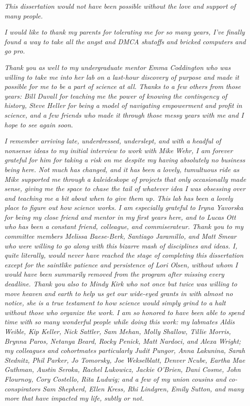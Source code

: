 \begin{acknowledgements}
\textit{This dissertation would not have been possible without the love and support of many people.}

\textit{I would like to thank my parents for tolerating me for so many years, I've finally found a way to take all the angst and DMCA shutoffs and bricked computers and go pro.}

\textit{Thank you as well to my undergraduate mentor Emma Coddington who was willing to take me into her lab on a last-hour discovery of purpose and made it possible for me to be a part of science at all. Thanks to a few others from those years: Bill Duvall for teaching me the power of knowing the contingency of history, Steve Heller for being a model of navigating empowerment and profit in science, and a few friends who made it through those messy years with me and I hope to see again soon.}

\textit{I remember arriving late, underdressed, underslept, and with a headful of nonsense ideas to my initial interview to work with Mike Wehr, I am forever grateful for him for taking a risk on me despite my having absolutely no business being here. Not much has changed, and it has been a lovely, tumultuous ride as Mike supported me through a kaleideskope of projects that only occasionally made sense, giving me the space to chase the tail of whatever idea I was obsessing over and teaching me a bit about when to give them up. This lab has been a lovely place to figure out how science works. I am especially grateful to Iryna Yavorska for being my close friend and mentor in my first years here, and to Lucas Ott who has been a constant friend, colleague, and commiserateur. Thank you to my committee members Melissa Baese-Berk, Santiago Jaramillo, and Matt Smear who were willing to go along with this bizarre mash of disciplines and ideas. I, quite literally, would never have reached the stage of completing this dissertation except for the saintlike patience and persistence of Lori Olsen, without whom I would have been summarily removed from the program after missing every deadline. Thank you also to Mindy Kirk who not once but twice was willing to move heaven and earth to help us get our wide-eyed grants in with almost no notice, she is a true testament to how science would simply grind to a halt without those who organize the work. I am so honored to have been able to spend time with so many wonderful people while doing this work: my labmates Aldis Weible, Kip Keller, Nick Sattler, Sam Mehan, Molly Shallow, Tillie Morris, Brynna Paros, Netanya Beard, Rocky Penick, Matt Nardoci, and Alexa Wright; my colleagues and cohortmates particularly Judit Pungor, Anna Lakunina, Sarah Stednitz, Phil Parker, Jo Tomorsky, Joe Wekselblatt, Denver Ncube, Eartha Mae Guthman, Austin Seroka, Rachel Lukowicz, Jackie O'Brien, Dani Cosme, John Flournoy, Cory Costello, Rita Ludwig; and a few of my union cousins and co-conspirators Sam Shepherd, Ellen Kress, Rhi Lindgren, Emily Sutton, and many more that have impacted my life, subtly or not.}


\end{acknowledgements}
